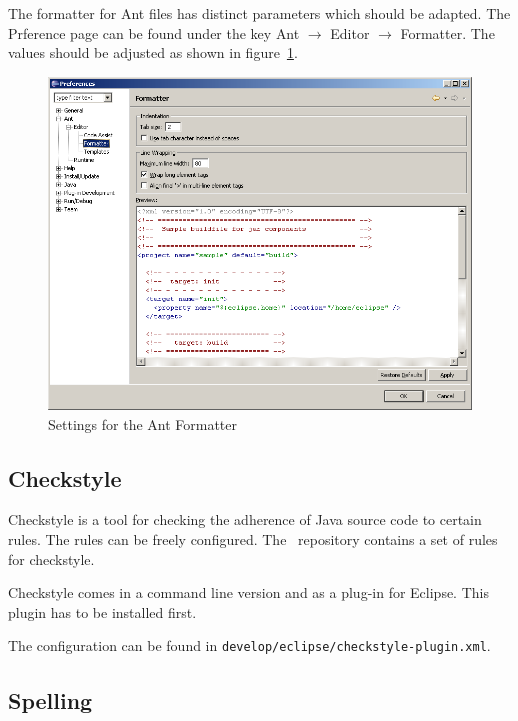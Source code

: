 \documentclass{extex-doc}
\newcommand\menu{\textsf}
\newcommand\sub{\(\rightarrow\) }
\begin{document}
\INCOMPLETE

The formatter for Ant files has distinct parameters which should be
adapted. The Prference page can be found under the key \menu{Ant \sub
  Editor \sub Formatter}. The values should be adjusted as shown in
figure~\ref{fig:eclipse-ant-formatter}.
\begin{figure}[htp]
  \centering  \includegraphics[scale=.4]{image/eclipse-ant-formatter}
  \caption{Settings for the  Ant Formatter}\label{fig:eclipse-ant-formatter}
\end{figure}


\subsection{Checkstyle}

Checkstyle is a tool for checking the adherence of Java source code to
certain rules. The rules can be freely configured. The \ExTeX\
repository contains a set of rules for checkstyle.

Checkstyle comes in a command line version and as a plug-in for
Eclipse. This plugin has to be installed first.

The configuration can be found in
\texttt{develop/eclipse/checkstyle-plugin.xml}.

\INCOMPLETE


\subsection{Spelling}
\end{document}
